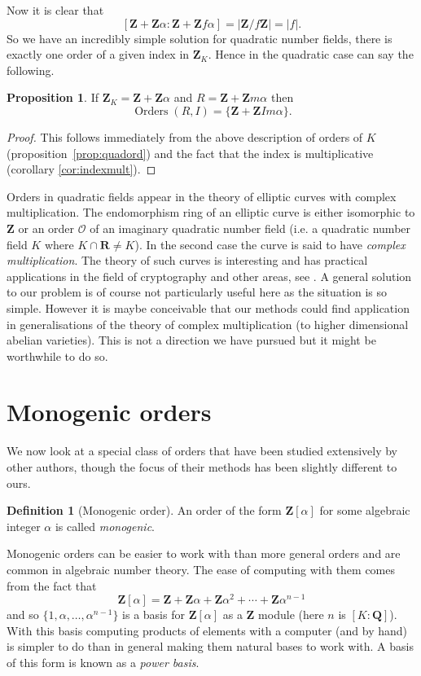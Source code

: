 \documentclass[12pt,a4paper,abstracton,bibtotoc]{scrreprt}
\theoremstyle{definition}
\newtheorem{prop}{Proposition}
\newtheorem{defn}{Definition}
\newcommand{\QQ}{\mathbf{Q}}
\newcommand{\RR}{\mathbf{R}}
\newcommand{\ZZ}{\mathbf{Z}}
\renewcommand{\O}{\mathcal{O}}
\DeclareMathOperator{\Orders}{Orders}
\begin{document}
Now it is clear that
\[
[\ZZ + \ZZ\alpha : \ZZ + \ZZ f \alpha] = |\ZZ/f\ZZ| = |f|.
\]
So we have an incredibly simple solution for quadratic number fields, there is exactly one order of a given index in $\ZZ_K$.
Hence in the quadratic case can say the following.

\begin{prop}
If $\ZZ_K = \ZZ + \ZZ\alpha$ and $R = \ZZ + \ZZ m\alpha$ then
\[
\Orders(R, I) = \{\ZZ + \ZZ Im\alpha\}.
\]
\end{prop}
\begin{proof}
This follows immediately from the above description of orders of $K$ (proposition~\ref{prop:quadord}) and the fact that the index is multiplicative (corollary \ref{cor:indexmult}).
\end{proof}

Orders in quadratic fields appear in the theory of elliptic curves with complex multiplication.
The endomorphism ring of an elliptic curve is either isomorphic to $\ZZ$ or an order $\O$ of an imaginary quadratic number field (i.e. a quadratic number field $K$ where $K\cap \RR \ne K$).
In the second case the curve is said to have \emph{complex multiplication}.
The theory of such curves is interesting and has practical applications in the field of cryptography and other areas, see \cite{schertz}.
A general solution to our problem is of course not particularly useful here as the situation is so simple.
However it is maybe conceivable that our methods could find application in generalisations of the theory of complex multiplication (to higher dimensional abelian varieties).
This is not a direction we have pursued but it might be worthwhile to do so.

\section{Monogenic orders}
\label{sec:monogenic}
We now look at a special class of orders that have been studied extensively by other authors, though the focus of their methods has been slightly different to ours.

\begin{defn}[Monogenic order]
An order of the form $\ZZ[\alpha]$ for some algebraic integer $\alpha$ is called \emph{monogenic}.
\end{defn}

Monogenic orders can be easier to work with than more general orders and are common in algebraic number theory.
The ease of computing with them comes from the fact that
\[
\ZZ[\alpha] = \ZZ + \ZZ\alpha + \ZZ\alpha^2 + \cdots + \ZZ\alpha^{n-1}
\]
and so $\{1,\alpha,\ldots,\alpha^{n-1}\}$ is a basis for $\ZZ[\alpha]$ as a $\ZZ$ module (here $n$ is $[K : \QQ]$).
With this basis computing products of elements with a computer (and by hand) is simpler to do than in general making them natural bases to work with.
A basis of this form is known as a \emph{power basis}.
\end{document}
